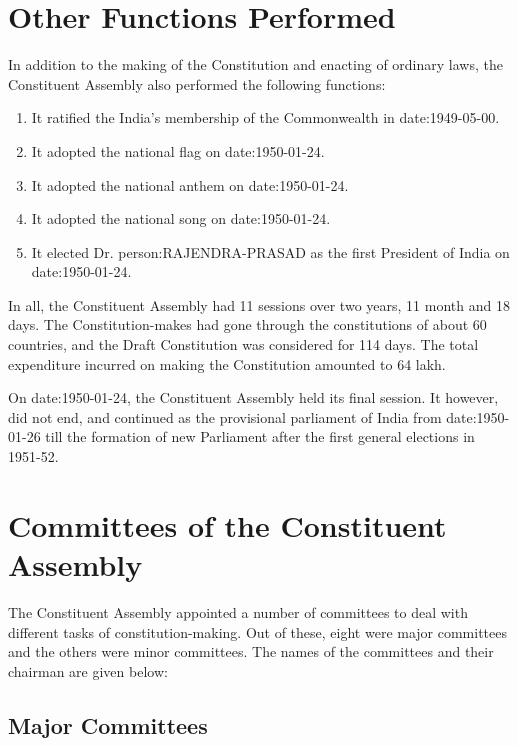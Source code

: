\begin{multicols}{2}
\section{Other Functions Performed}

In addition to the making of the Constitution and enacting of ordinary laws, the Constituent Assembly also performed the following functions:

\begin{enumerate}
  \item It ratified the India's membership of the Commonwealth in \gls{date:1949-05-00}.
  \item It adopted the national flag on \gls{date:1950-01-24}.
  \item It adopted the national anthem on \gls{date:1950-01-24}.
  \item It adopted the national song on \gls{date:1950-01-24}.
  \item It elected Dr. \gls{person:RAJENDRA-PRASAD} as the first President of India on \gls{date:1950-01-24}.
\end{enumerate}

In all, the Constituent Assembly had 11 sessions over two years, 11 month and 18 days. The Constitution-makes had gone through the constitutions of about 60 countries, and the Draft Constitution was considered for 114 days. The total expenditure incurred on making the Constitution amounted to 64 lakh.

On \gls{date:1950-01-24}, the Constituent Assembly held its final session. It however, did not end, and continued as the provisional parliament of India from \gls{date:1950-01-26} till the formation of new Parliament after the first general elections in 1951-52.

\section{Committees of the Constituent Assembly}

The Constituent Assembly appointed a number of committees to deal with different tasks of constitution-making. Out of these, eight were major committees and the others were minor committees. The names of the committees and their chairman are given below:

\subsection{Major Committees}


\end{multicols}
